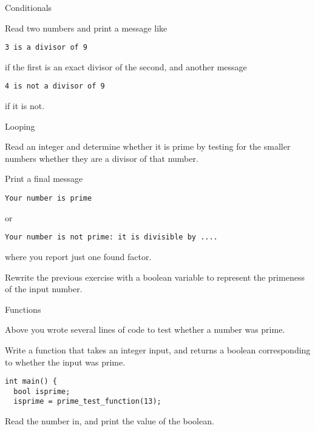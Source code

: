 
 {Conditionals}

\prerequisite{\ref{sec:if}}

\begin{exercise}
  \label{ex:prime:divtest}
  Read two numbers and print a message like
\begin{verbatim}
3 is a divisor of 9
\end{verbatim}
  if the first is an exact
  divisor of the second, and another message
\begin{verbatim}
4 is not a divisor of 9
\end{verbatim}
if it is not.
\end{exercise}

 {Looping}

\prerequisite{\ref{sec:for}}

\begin{exercise}
  \label{ex:prime:test}
  Read an integer and determine whether it is prime by testing for the
  smaller numbers whether they are a
  divisor of that number. 

  Print a final message
\begin{verbatim}
Your number is prime
\end{verbatim}
or
\begin{verbatim}
Your number is not prime: it is divisible by ....
\end{verbatim}
where you report just one found factor.
\end{exercise}

\begin{exercise}
  \label{ex:prime:test2}
  Rewrite the previous exercise with a boolean variable to represent
  the primeness of the input number.
\end{exercise}

 {Functions}

\prerequisite{\ref{ch:function}}

Above you wrote several lines of code to test whether a number was
prime.

\begin{exercise}
  \label{ex:prime:func}
  Write a function  that takes an integer input, and returns a boolean
  corresponding to whether the input was prime.
\begin{verbatim}
int main() {
  bool isprime;
  isprime = prime_test_function(13);
\end{verbatim}
  Read the number in, and print the value of the boolean.
\end{exercise}

